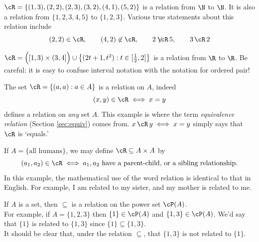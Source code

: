 \begin{examples}
\item $\cR=\{(1,3),(2,2),(2,3),(3,2),(4,1),(5,2)\}$ is a relation from $\N$ to $\N$. It is also a relation from $\{1,2,3,4,5\}$ to $\{1,2,3\}$. Various true statements about this relation include
\[(2,2)\in\cR,\qquad (4,2)\not\in\cR,\qquad 2\not\!\!\cR\,5,\qquad 3\,\cR\,2\]
\item $\cR=\Bigl([1,3)\times (3,4]\Bigr)\cup\big\{(2t+1,t^2):t\in [\frac 12,2]\big\}$ is a relation from $\R$ to $\R$. Be careful: it is easy to confuse interval notation with the notation for ordered pair!
\item The set $\cR=\{(a,a):a\in A\}$ is a relation on $A$, indeed
\[(x,y)\in \cR\iff x=y\]
defines a relation on \emph{any} set $A$. This example is where the term \emph{equivalence relation} (Section \ref{sec:equiv}) comes from. $x\,\cR\,y\iff x=y$ simply says that $\cR$ is `equals.'
\item If $A=\{\text{all humans}\}$, we may define $\cR\subseteq A\times A$ by
\[(a_1,a_2)\in \cR\iff a_1,a_2\text{ have a parent-child, or a sibling relationship.}\]
In this example, the mathematical use of the word relation is identical to that in English. For example, I am related to my sister, and my mother is related to me.
\item If $A$ is a set, then $\subseteq$ is a relation on the power set $\cP(A)$.\\
For example, if $A=\{1,2,3\}$ then $\{1\}\in\cP(A)$ and $\{1,3\}\in\cP(A)$. We'd say that $\{1\}$ is related to $\{1,3\}$ since $\{1\}\subseteq\{1,3\}$.\\
It should be clear that, under the relation $\subseteq$, that $\{1,3\}$ is not related to $\{1\}$.
\end{examples}


